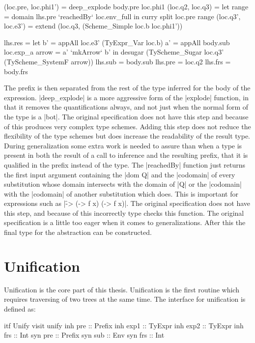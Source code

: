 \begin{code}
(loc.pre, loc.phi1')  = deep_explode body.pre loc.phi1
(loc.q2,  loc.q3)     =  let range = domain lhs.pre `reachedBy` loc.env_full
                         in curry split loc.pre range
(loc.q3', loc.e3')    = extend (loc.q3, (Scheme_Simple loc.b loc.phi1'))
    
lhs.res =  let  b'     = appAll loc.e3' (TyExpr_Var loc.b)
                a'     = appAll body.sub loc.exp_a
                arrow  = a' `mkArrow` b'
           in desugar (TyScheme_Sugar loc.q3' (TyScheme_SystemF arrow))
lhs.sub  = body.sub
lhs.pre  = loc.q2
lhs.frs  = body.frs
\end{code}
The prefix is then separated from the rest of the type inferred for the body of the expression. |deep_explode| is a more aggressive form of the |explode| function, in that it removes the quantifications always, and not just when the normal form of the type is a |bot|. The original specification does not have this step and because of this produces very complex type schemes. Adding this step does not reduce the flexibility of the type schemes but does increase the readability of the result type. 
During generalization some extra work is needed to assure than when a type is present in both the result of a call to inference and the resulting prefix, that it is qualified in the prefix instead of the type.
The |reachedBy| function just returns the first input argument containing the |dom Q| and the |codomain| of every substitution whose domain intersects with the domain of |Q| or the |codomain| with the |codomain| of another substitution which does. This is important for expressions such as |\f -> (\x -> f x) (\x -> f x)|. The original specification does not have this step, and because of this incorrectly type checks this function. The original specification is a little too eager when it comes to generalizations. After this the final type for the abstraction can be constructed.

\section{Unification}
Unification is the core part of this thesis. Unification is the first routine which requires traversing of two trees at the same time. The interface for unification is defined as:

\begin{code}
itf Unify
  visit unify
    inh pre   :: Prefix
    inh exp1  :: TyExpr
    inh exp2  :: TyExpr
    inh frs   :: Int
    syn pre   :: Prefix
    syn sub   :: Env
    syn frs   :: Int
\end{code}

